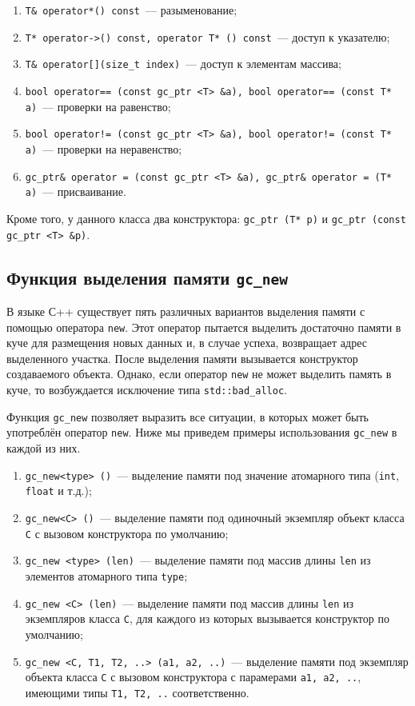 \begin{enumerate}
\item \lstinline{T& operator*() const}~--- разыменование;
\item \lstinline{T* operator->() const, operator T* () const}~--- доступ к указателю;
\item \lstinline{T& operator[](size_t index)}~--- доступ к элементам массива;
\item \lstinline{bool operator== (const gc_ptr <T> &a), bool operator== (const T* a)}~--- проверки на равенство;
\item \lstinline{bool operator!= (const gc_ptr <T> &a), bool operator!= (const T* a)}~--- проверки на неравенство;
\item \lstinline{gc_ptr& operator = (const gc_ptr <T> &a), gc_ptr& operator = (T* a)}~--- присваивание.
\end{enumerate}

Кроме того, у данного класса два конструктора: \lstinline{gc_ptr (T* p)} и \lstinline{gc_ptr (const gc_ptr <T> &p)}. 

\subsection{Функция выделения памяти \lstinline{gc_new}}

В языке С++ существует пять различных вариантов выделения памяти с помощью оператора \lstinline{new}. 
Этот оператор пытается выделить достаточно памяти в куче для размещения новых данных и, в случае успеха, возвращает 
адрес выделенного участка. После выделения памяти вызывается конструктор создаваемого объекта. Однако, если оператор
\lstinline{new} не может выделить память в куче, то возбуждается исключение типа \lstinline{std::bad_alloc}. 

Функция \lstinline{gc_new} позволяет выразить все ситуации, в которых может быть употреблён оператор \lstinline{new}.
Ниже мы приведем примеры использования \lstinline{gc_new} в каждой из них.

\begin {enumerate}
\item \lstinline{gc_new<type> ()}~--- выделение памяти под значение атомарного типа (\lstinline{int}, \lstinline{float} и т.д.); 
\item \lstinline{gc_new<C> ()}~--- выделение памяти под одиночный экземпляр объект класса \lstinline{C} с вызовом конструктора по
умолчанию;
\item \lstinline{gc_new <type> (len)}~--- выделение памяти под массив длины \lstinline{len} из элементов атомарного типа \lstinline{type};
\item \lstinline{gc_new <C> (len)}~--- выделение памяти под массив длины \lstinline{len} из экземпляров класса \lstinline{C}, для каждого из
которых вызывается конструктор по умолчанию;
\item \lstinline{gc_new <C, T1, T2, ..> (a1, a2, ..)}~--- выделение памяти под экземпляр объекта класса \lstinline{C} с вызовом
конструктора с парамерами \lstinline{a1, a2, ..}, имеющими типы \lstinline{T1, T2, ..} соответственно.
\end {enumerate}

